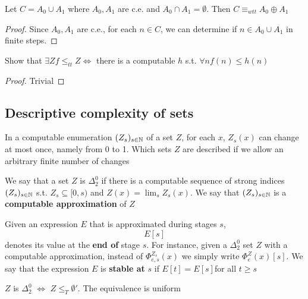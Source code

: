 \documentclass[11pt]{article}
\begin{document}
\begin{exercise}
\label{1.2.24}
Let \(C=A_0\cup A_1\) where \(A_0,A_1\) are c.e. and \(A_0\cap A_1=\emptyset\). Then \(C\equiv_{wtt}A_0\oplus A_1\)
\end{exercise}

\begin{proof}
Since \(A_0,A_1\) are c.e., for each \(n\in C\), we can determine if \(n\in A_0\cup A_1\) in finite steps.
\end{proof}

\begin{exercise}
\label{1.2.25}
Show that \(\exists Zf\le_{tt}Z\Leftrightarrow\) there is a computable \(h\) s.t. \(\forall nf(n)\le h(n)\)
\end{exercise}

\begin{proof}
Trivial
\end{proof}
\subsection{Descriptive complexity of sets}
\label{sec:org1b5905f}
In a computable enumeration \((Z_s)_{s\in\mathbb{N}}\) of a set \(Z\), for each \(x\), \(Z_s(x)\) can
change at most once, namely from 0 to 1. Which sets \(Z\) are described if we allow an arbitrary
finite number of changes


\begin{definition}[]
We say that a set \(Z\) is \(\Delta_2^0\) if there is a computable sequence of strong
indices \((Z_s)_{s\in\mathbb{N}}\) s.t. \(Z_s\subseteq[0,s)\) and \(Z(x)=\lim_sZ_s(x)\). We say
that \((Z_s)_{s\in\mathbb{N}}\) is a \textbf{computable approximation} of \(Z\)
\end{definition}

Given an expression \(E\) that is approximated during stages \(s\),
\begin{equation*}
E[s]
\end{equation*}
denotes its value at the \textbf{end of} stage \(s\). For instance, given a \(\Delta_2^0\) set \(Z\) with a
computable approximation, instead of \(\Phi_{e,s}^{Z_s}(x)\) we simply write \(\Phi_e^Z(x)[s]\). We say
that the expression \(E\) is \textbf{stable at} \(s\) if \(E[t]=E[s]\)for all \(t\ge s\)

\begin{lemma}
\label{1.4.2}
\(Z\) is \(\Delta_2^0\) \(\Leftrightarrow\) \(Z\le_T\emptyset'\). The equivalence is uniform
\end{lemma}
\end{document}
